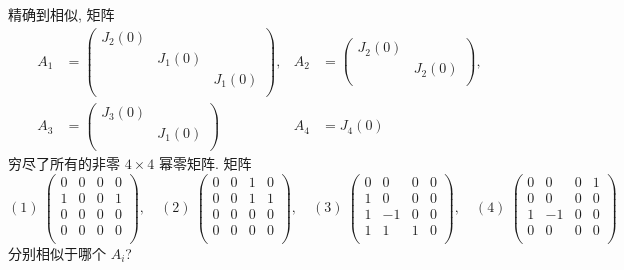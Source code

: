 \documentclass[color=black,device=normal,lang=cn,mode=geye]{elegantnote}
\begin{document}
\begin{exercise}%
    精确到相似, 矩阵
    \begin{align*}
        A_1 & =\begin{pmatrix}
            J_2(0) \\
            & J_1(0) \\
            && J_1(0) \\
        \end{pmatrix}, & A_2 & =\begin{pmatrix}
            J_2(0) \\
            & J_2(0) \\
        \end{pmatrix}, \\
        A_3 & =\begin{pmatrix}
            J_3(0) \\
            & J_1(0) \\
        \end{pmatrix} & A_4 & =J_4(0)
    \end{align*}
    穷尽了所有的非零 $4\times 4$ 幂零矩阵. 矩阵
    \[(1)\ \begin{pmatrix}
        0 & 0 & 0 & 0 \\
        1 & 0 & 0 & 1 \\
        0 & 0 & 0 & 0 \\
        0 & 0 & 0 & 0 \\
    \end{pmatrix},\quad(2)\ \begin{pmatrix}
        0 & 0 & 1 & 0 \\
        0 & 0 & 1 & 1 \\
        0 & 0 & 0 & 0 \\
        0 & 0 & 0 & 0 \\
    \end{pmatrix},\quad(3)\ \begin{pmatrix}
        0 & 0 & 0 & 0 \\
        1 & 0 & 0 & 0 \\
        1 & -1 & 0 & 0 \\
        1 & 1 & 1 & 0 \\
    \end{pmatrix},\quad(4)\ \begin{pmatrix}
        0 & 0 & 0 & 1 \\
        0 & 0 & 0 & 0 \\
        1 & -1 & 0 & 0 \\
        0 & 0 & 0 & 0 \\
    \end{pmatrix}\]
    分别相似于哪个 $A_i$?
\end{exercise}
\end{document}
